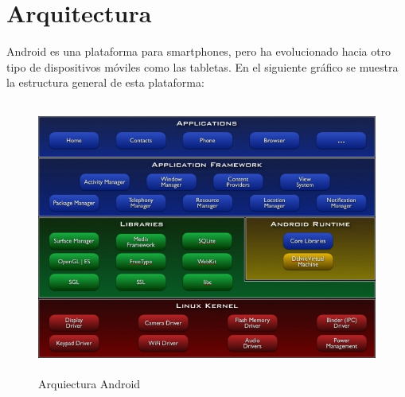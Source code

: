 \section{Arquitectura}

Android es una plataforma para smartphones, pero ha evolucionado hacia otro tipo de dispositivos móviles como las tabletas. En el siguiente gráfico se muestra la estructura general de esta plataforma:
\begin{figure}[ht]
\centering
\includegraphics[height=9cm]{imagenes/capitulo2/androidArchitecture.jpg}
\caption{Arquiectura Android}
\end{figure} 


